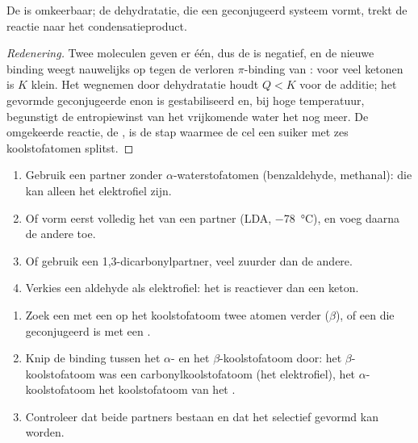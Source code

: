 \begin{proposition}\label{prop:b2:enolates-aldol:aldol-equilibrium}
De  is omkeerbaar; de dehydratatie, die een geconjugeerd systeem vormt, trekt de
reactie naar het condensatieproduct.
\end{proposition}

\begin{proof}[Redenering]
Twee moleculen geven er één, dus de  is negatief, en de nieuwe binding  weegt nauwelijks
op tegen de verloren $\pi$-binding van : voor veel ketonen is $K$ klein. Het  wegnemen door dehydratatie
houdt $Q < K$ voor de additie; het gevormde geconjugeerde enon is gestabiliseerd en, bij hoge temperatuur,
begunstigt de entropiewinst van het vrijkomende water het nog meer. De omgekeerde reactie, de , is de
stap waarmee de cel een suiker met zes koolstofatomen splitst.
\end{proof}

\begin{method}\label{met:b2:enolates-aldol:crossed-aldol}
\begin{enumerate}
  \item Gebruik een partner zonder $\alpha$-waterstofatomen (benzaldehyde, methanal): die kan alleen het
        elektrofiel zijn.
  \item Of vorm eerst volledig het  van een partner (LDA, \qty{-78}{\degreeCelsius}), en voeg daarna
        de andere toe.
  \item Of gebruik een 1,3-dicarbonylpartner, veel zuurder dan de andere.
  \item Verkies een aldehyde als elektrofiel: het is reactiever dan een keton.
\end{enumerate}
\end{method}

\begin{method}\label{met:b2:enolates-aldol:aldol-recognition}
\begin{enumerate}
  \item Zoek een  met een  op het koolstofatoom twee atomen verder ($\beta$), of een 
        die geconjugeerd is met een .
  \item Knip de binding tussen het $\alpha$- en het $\beta$-koolstofatoom door: het $\beta$-koolstofatoom was een carbonylkoolstofatoom (het
        elektrofiel), het $\alpha$-koolstofatoom het koolstofatoom van het .
  \item Controleer dat beide partners bestaan en dat het  selectief gevormd kan worden.
\end{enumerate}
\end{method}

